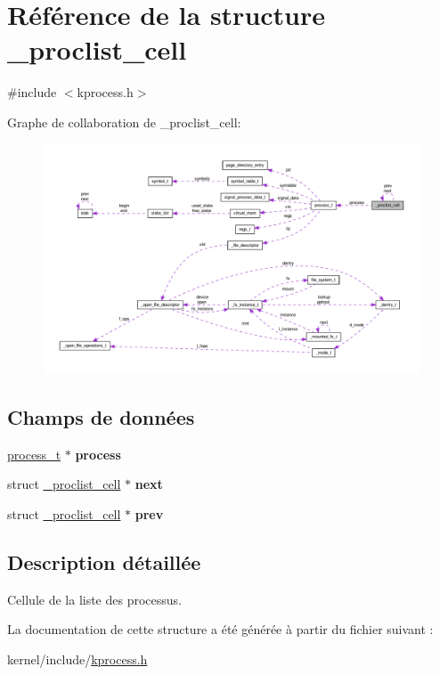 \hypertarget{struct__proclist__cell}{\section{\-Référence de la structure \-\_\-proclist\-\_\-cell}
\label{struct__proclist__cell}
}


{\ttfamily \#include $<$kprocess.\-h$>$}



\-Graphe de collaboration de \-\_\-proclist\-\_\-cell\-:\nopagebreak
\begin{figure}[H]
\begin{center}
\leavevmode
\includegraphics[width=350pt]{struct__proclist__cell__coll__graph}
\end{center}
\end{figure}
\subsection*{\-Champs de données}
\begin{DoxyCompactItemize}
\item 
\hypertarget{struct__proclist__cell_abe320ebc4ea6556f17dd28e93efb6b31}{\hyperlink{structprocess__t}{process\-\_\-t} $\ast$ {\bfseries process}}\label{struct__proclist__cell_abe320ebc4ea6556f17dd28e93efb6b31}

\item 
\hypertarget{struct__proclist__cell_a76062c3c8bce7b458ed610e7568c0858}{struct \hyperlink{struct__proclist__cell}{\-\_\-proclist\-\_\-cell} $\ast$ {\bfseries next}}\label{struct__proclist__cell_a76062c3c8bce7b458ed610e7568c0858}

\item 
\hypertarget{struct__proclist__cell_aee5c3bd7595d05c693fe6df63937052e}{struct \hyperlink{struct__proclist__cell}{\-\_\-proclist\-\_\-cell} $\ast$ {\bfseries prev}}\label{struct__proclist__cell_aee5c3bd7595d05c693fe6df63937052e}

\end{DoxyCompactItemize}


\subsection{\-Description détaillée}
\-Cellule de la liste des processus. 

\-La documentation de cette structure a été générée à partir du fichier suivant \-:\begin{DoxyCompactItemize}
\item 
kernel/include/\hyperlink{kprocess_8h}{kprocess.\-h}\end{DoxyCompactItemize}

